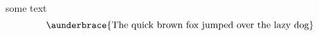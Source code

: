 \documentclass{kapital}
\begin{document}
   some text
   \[
   	\aunderbrace{\textrm{The quick brown fox jumped over the lazy dog}}
   \]
\end{document}
